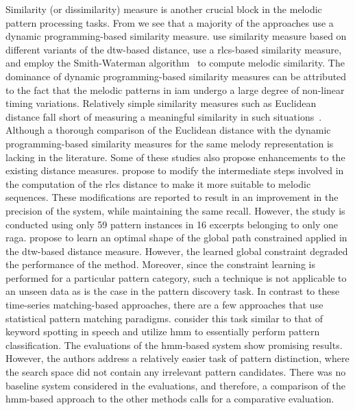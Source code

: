 {Similarity (or dissimilarity) measure is another crucial block in the melodic pattern processing tasks. From  we see that a majority of the approaches use a dynamic programming-based similarity measure. \cite{Ross2012,Ross2012b,rao2013distinguishing,Rao2014} use similarity measure based on different variants of the \gls{dtw}-based distance, \cite{Ishwar2013,Dutta2014,dutta2014modified} use a \gls{rlcs}-based similarity measure, and \cite{ganguli2015efficient} employ the Smith-Waterman algorithm~\citep{smith1981identification} to compute melodic similarity. The dominance of dynamic programming-based similarity measures can be attributed to the fact that the melodic patterns in \gls{iam} undergo a large degree of non-linear timing variations. Relatively simple similarity measures such as Euclidean distance fall short of measuring a meaningful similarity in such situations~\citep{Ross2012b}. Although a thorough comparison of the Euclidean distance with the dynamic programming-based similarity measures for the same melody representation is lacking in the literature. Some of these studies also propose enhancements to the existing distance measures. \cite{dutta2014modified} propose to modify the intermediate steps involved in the computation of the \gls{rlcs} distance to make it more suitable to melodic sequences. These modifications are reported to result in an improvement in the precision of the system, while maintaining the same recall. However, the study is conducted using only 59 pattern instances in 16 excerpts belonging to only one \gls{raga}. \cite{Rao2014} propose to learn an optimal shape of the global path constrained applied in the \gls{dtw}-based distance measure. However, the learned global constraint degraded the performance of the method. Moreover, since the constraint learning is performed for a particular pattern category, such a technique is not applicable to an unseen data as is the case in the pattern discovery task. In contrast to these time-series matching-based approaches, there are a few approaches that use statistical pattern matching paradigms. \cite{ishwar2012motivic,Rao2014} consider this task similar to that of keyword spotting in speech and utilize \gls{hmm} to essentially perform pattern classification. The evaluations of the \gls{hmm}-based system show promising results. However, the authors address a relatively easier task of pattern distinction, where the search space did not contain any irrelevant pattern candidates. There was no baseline system considered in the evaluations, and therefore, a comparison of the \gls{hmm}-based approach to the other methods calls for a comparative evaluation.

}
